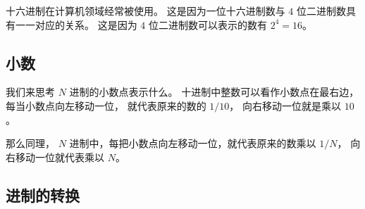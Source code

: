 十六进制在计算机领域经常被使用。 这是因为一位十六进制数与 $4$ 位二进制数具有一一对应的关系。 这是因为 $4$ 位二进制数可以表示的数有 $2^4 = 16$。

\subsection{小数}
我们来思考 $N$ 进制的小数点表示什么。 十进制中整数可以看作小数点在最右边， 每当小数点向左移动一位， 就代表原来的数的 $1/10$， 向右移动一位就是乘以 $10$。

那么同理， $N$ 进制中，每把小数点向左移动一位，就代表原来的数乘以 $1/N$， 向右移动一位就代表乘以 $N$。

\subsection{进制的转换}
